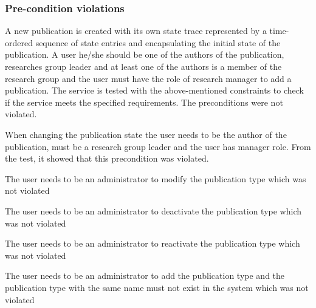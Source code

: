 \subsubsection{Pre-condition violations}
A new publication is created with its own state trace represented by a time-ordered sequence of state entries and encapsulating the initial state of the publication. A user he/she should be one of the authors of the publication, researches group leader and at least one of the authors is a member of the research group and the user must have the role of research manager to add a publication.
The service is tested with the above-mentioned constraints to check if the service meets the specified requirements. The preconditions were not violated.

When changing the publication state the user needs to be the author of the publication, must be a research group leader and the user has manager role. From the test, it showed that this precondition was violated.

The user needs to be an administrator to modify the publication type which was not violated

The user needs to be an administrator to deactivate the publication type which was not violated

The user needs to be an administrator to reactivate the publication type which was not violated

The user needs to be an administrator to add the publication type and the publication type with the same name must not exist in the system which was not violated